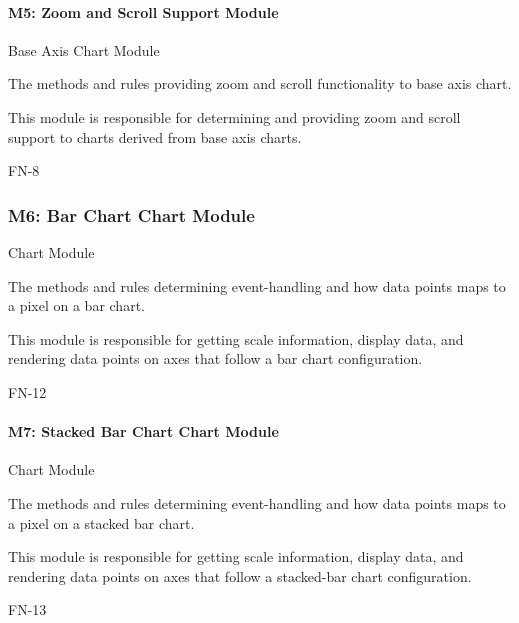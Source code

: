 \documentclass[12pt, titlepage]{article}
\begin{document}
\paragraph{M5: Zoom and Scroll Support Module}
\begin{description}[style=nextline]
\item[Type:] Base Axis Chart Module
\item[Secrets:] The methods and rules providing zoom and scroll functionality to base axis chart. 
\item[Responsibilities:]  This module is responsible for determining and providing zoom and scroll support to charts derived from base axis charts. 
\item[Requirements:] FN-8
\end{description}


\subsubsection{M6: Bar Chart Chart Module}
\begin{description}[style=nextline]
\item[Type:] Chart Module
\item[Secrets:] The methods and rules determining event-handling and how data points maps to a pixel on a bar chart.  
\item[Responsibilities:] This module is responsible for getting scale information, display data, and rendering data points on axes that follow a bar chart configuration. 
\item[Requirements:] FN-12
\end{description}


\paragraph{M7: Stacked Bar Chart Chart Module}
\begin{description}[style=nextline]
\item[Type:] Chart Module
\item[Secrets:] The methods and rules determining event-handling and how data points maps to a pixel on a stacked bar chart. 
\item[Responsibilities:]  This module is responsible for getting scale information, display data, and rendering data points on axes that follow a stacked-bar chart configuration.
\item[Requirements:] FN-13
\end{description}
\end{document}
